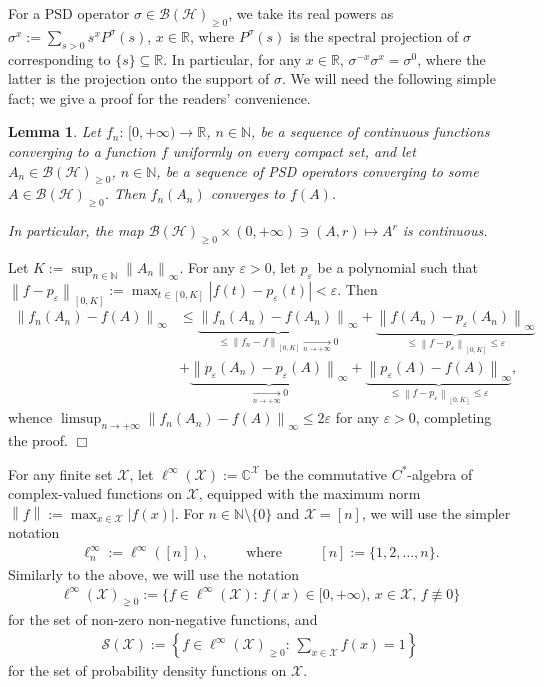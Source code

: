 \documentclass[unsortedaddress,superscriptaddress,pra,notitlepage]{revtex4}
\newtheorem{lemma}[definition]{Lemma}
\newenvironment{proof}[1][Proof]{\begin{trivlist}
\item[\hskip \labelsep {\bfseries #1}]}{\hfill$\Box$\end{trivlist}}
\def\B{{\mathcal B}}
\def\S{{\mathcal S}}
\def\X{{\mathcal X}}
\def\bN{\mathbb{N}}
\def\bC{\mathbb{C}}
\def\bR{\mathbb{R}}
\def\ep{\varepsilon}
\def\hil{{\mathcal H}}
\def\p{_{\ge 0}}
\def\pne{_{\gneq 0}}
\newcommand{\ds}{\mbox{ }\mbox{ }}
\newcommand{\norm}[1]{\left\| #1\right\|}
\begin{document}
For a PSD operator $\sigma\in\B(\hil)\p$, we take its real powers as
$\sigma^x:=\sum_{s>0}s^x P^{\sigma}(s)$, $x\in\bR$, where $P^{\sigma}(s)$ is the spectral projection of $\sigma$ corresponding to $\{s\}\subseteq\bR$. In particular, for any $x\in\bR$,
$\sigma^{-x}\sigma^x=\sigma^0$, where the latter is the projection onto the support of $\sigma$. We will need the following simple fact; we give a proof for the readers' convenience.

\begin{lemma}\label{lemma:uniform conv}
Let $f_n:\,[0,+\infty)\to\bR$, $n\in\bN$, be a sequence of continuous functions converging to a function $f$ uniformly on every compact set, and let $A_n\in\B(\hil)\p$, $n\in\bN$, be a sequence of PSD operators converging to some $A\in\B(\hil)\p$. Then $f_n(A_n)$ converges to $f(A)$. 

In particular, the map $\B(\hil)\p\times(0,+\infty)\ni(A,r)\mapsto A^r$ is continuous. 
\end{lemma}
\begin{proof}
Let $K:=\sup_{n\in\bN}\norm{A_n}_{\infty}$. For any $\ep>0$, let $p_{\ep}$ be a polynomial such that $\norm{f-p_{\ep}}_{[0,K]}:=\max_{t\in[0,K]}|f(t)-p_{\ep}(t)|<\ep$. Then  
\begin{align*}
\norm{f_n(A_n)-f(A)}_{\infty}&\le
\underbrace{\norm{f_n(A_n)-f(A_n)}_{\infty}}_{\le\norm{f_n-f}_{[0,K]}\xrightarrow[n\to+\infty]{}0}+
\underbrace{\norm{f(A_n)-p_{\ep}(A_n)}_{\infty}}_{\le \norm{f-p_{\ep}}_{[0,K]}\le\ep}\\
&
+\underbrace{\norm{p_{\ep}(A_n)-p_{\ep}(A)}_{\infty}}_{\xrightarrow[n\to+\infty]{}0}
+\underbrace{\norm{p_{\ep}(A)-f(A)}_{\infty}}_{\le \norm{f-p_{\ep}}_{[0,K]}\le\ep},
\end{align*}
whence $\limsup_{n\to+\infty}\norm{f_n(A_n)-f(A)}_{\infty}\le 2\ep$
for any $\ep>0$,
completing the proof.
\end{proof}

For any finite set $\X$, let 
$\ell^{\infty}(\X):=\bC^{\X}$
be the
commutative $C^*$-algebra of complex-valued functions on $\X$, equipped with the maximum norm 
$\norm{f}:=\max_{x\in\X}|f(x)|$. For $n\in\bN\setminus\{0\}$ and $\X=[n]$, we will use the simpler notation
\begin{align*}
\ell^{\infty}_n:=\ell^{\infty}([n]), \ds\ds\text{where}\ds\ds
[n]:=\{1,2,\ldots,n\}.
\end{align*}
Similarly to the above, we will use the notation
\begin{align*}
\ell^{\infty}(\X)\pne:=\{f\in\ell^{\infty}(\X):\,f(x)\in[0,+\infty),\,x\in\X,\,f\not\equiv 0\}
\end{align*}
for the set of non-zero non-negative functions, and
\begin{align*}
\S(\X):=\left\{f\in\ell^{\infty}(\X)\pne:\,\sum\nolimits_{x\in\X} f(x)=1\right\}
\end{align*}
for the set of probability density functions
on $\X$.
\end{document}
